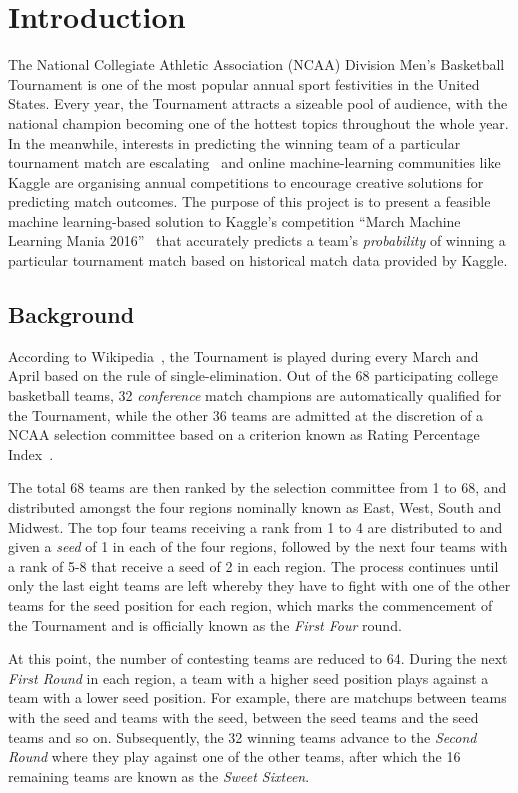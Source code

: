 \chapter{Introduction}
The National Collegiate Athletic Association (NCAA) Division  Men's Basketball Tournament is one of the most popular annual sport festivities in the United States. Every year, the Tournament attracts a sizeable pool of audience, with the national champion becoming one of the hottest topics throughout the whole year. In the meanwhile, interests in predicting the winning team of a particular tournament match are escalating~\cite{NP17} and online machine-learning communities like Kaggle are organising annual competitions to encourage creative solutions for predicting match outcomes. The purpose of this project is to present a feasible machine learning-based solution to Kaggle's competition ``March Machine Learning Mania 2016''~\cite{KG16} that accurately predicts a team's \emph{probability} of winning a particular tournament match based on historical match data provided by Kaggle. 

\section{Background}
According to Wikipedia~\cite{NCAA17}, the Tournament is played during every March and April based on the rule of single-elimination. Out of the 68 participating college basketball teams, 32 \emph{conference} match champions are automatically qualified for the Tournament, while the other 36 teams are admitted at the discretion of a NCAA selection committee based on a criterion known as Rating Percentage Index~\cite{WIK17}.

The total 68 teams are then ranked by the selection committee from 1 to 68, and distributed amongst the four regions nominally known as East, West, South and Midwest. The top four teams receiving a rank from 1 to 4 are distributed to and given a \emph{seed} of 1 in each of the four regions, followed by the next four teams with a rank of 5-8 that receive a seed of 2 in each region. The process continues until only the last eight teams are left whereby they have to fight with one of the other teams for the  seed position for each region, which marks the commencement of the Tournament and is officially known as the \emph{First Four} round. 

At this point, the number of contesting teams are reduced to 64. During the next \emph{First Round} in each region, a team with a higher seed position plays against a team with a lower seed position. For example, there are matchups between teams with the  seed and teams with the  seed, between the  seed teams and the  seed teams and so on. Subsequently, the 32 winning teams advance to the \emph{Second Round} where they play against one of the other teams, after which the 16 remaining teams are known as the \emph{Sweet Sixteen}. 

